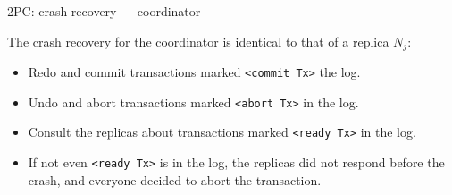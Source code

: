 %
%

\begin{frame}{2PC: crash recovery --- coordinator}

The crash recovery for the coordinator is identical to that of a replica $N_j$:

\begin{itemize}[-,noitemsep,topsep=-5pt]
\item Redo and commit transactions marked \lstinline[style=cmput391]!<commit Tx>! the log.
\item Undo and abort transactions marked \lstinline[style=cmput391]!<abort Tx>! in the log.
\item Consult the replicas about transactions marked \lstinline[style=cmput391]!<ready Tx>! in the log.
\item If not even \lstinline[style=cmput391]!<ready Tx>! is in the log, the replicas did not respond before the crash, and everyone decided to abort the transaction.
\end{itemize}
\end{frame}


%
%

